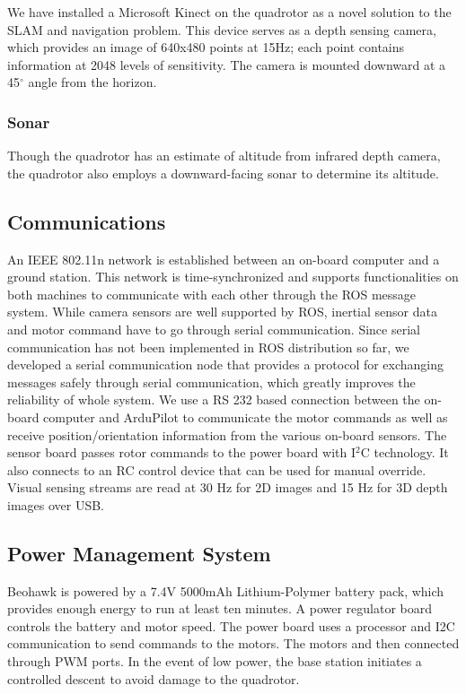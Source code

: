 \documentclass[12pt, letterpaper]{article}
\begin{document}
We have installed a Microsoft Kinect on the quadrotor as a novel solution to the SLAM and navigation problem. This device serves as a depth sensing camera, which provides an image of 640x480 points at 15Hz; each point contains information at 2048 levels of sensitivity. The camera is mounted downward at a 45$^\circ$ angle from the horizon.

\subsubsection{Sonar}

Though the quadrotor has an estimate of altitude from infrared depth camera, the quadrotor also employs a downward-facing sonar to determine its altitude.

\subsection{Communications}

An IEEE 802.11n network is established between an on-board computer and a ground station. This network is time-synchronized and supports functionalities on both machines to communicate with each other through the ROS message system. While camera sensors are well supported by ROS, inertial sensor data and motor command have to go through serial communication. Since serial communication has not been implemented in ROS distribution so far, we developed a serial communication node that provides a protocol for exchanging messages safely through serial communication, which greatly improves the reliability of whole system. We use a RS 232 based connection between the on-board computer and ArduPilot to communicate the motor commands as well as receive position/orientation information from the various on-board sensors. The sensor board passes rotor commands to the power board with I$^2$C technology. It also connects to an RC control device that can be used for manual override. Visual sensing streams are read at 30 Hz for 2D images and 15 Hz for 3D depth images over USB.

\subsection{Power Management System}

Beohawk is powered by a 7.4V 5000mAh Lithium-Polymer battery pack, which provides enough energy to run at least ten minutes. A power regulator board controls the battery and motor speed. The power board uses a processor and I2C communication to send commands to the motors. The motors and then connected through PWM ports. In the event of low power, the base station initiates a controlled descent to avoid damage to the quadrotor.
\end{document}
